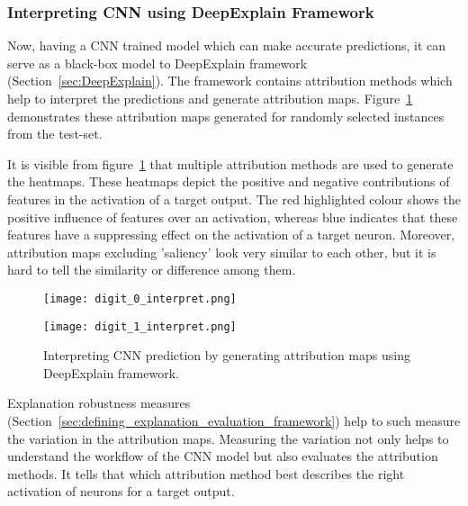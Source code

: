 \documentclass[english]{tktltiki2}
\theoremstyle{definition}
\theoremstyle{remark}
\begin{document}
\subsubsection{Interpreting CNN using DeepExplain Framework}
Now, having a CNN trained model which can make accurate predictions, it can serve as a black-box model to DeepExplain framework (Section~\ref{sec:DeepExplain}). The framework contains attribution methods which help to interpret the predictions and generate attribution maps. Figure~\ref{fig:interpreting_CNN_using_DeepExplain} demonstrates these attribution maps generated for randomly selected instances from the test-set.

It is visible from figure~\ref{fig:interpreting_CNN_using_DeepExplain} that multiple attribution methods are used to generate the heatmaps. These heatmaps depict the positive and negative contributions of features in the activation of a target output. The red highlighted colour shows the positive influence of features over an activation, whereas blue indicates that these features have a suppressing effect on the activation of a target neuron. Moreover, attribution maps excluding 'saliency' look very similar to each other, but it is hard to tell the similarity or difference among them. 

\begin{figure}[H]
	\vspace*{0mm}
	\centering
	\texttt{[image: digit\_0\_interpret.png]}
\end{figure}

\begin{figure}[H]
	\vspace*{-10 mm}
	\centering
	\texttt{[image: digit\_1\_interpret.png]}
	\caption{Interpreting CNN prediction by generating attribution maps using DeepExplain framework.}%
	\label{fig:interpreting_CNN_using_DeepExplain}%
\end{figure}
 
Explanation robustness measures (Section~\ref{sec:defining_explanation_evaluation_framework}) help to such measure the variation in the attribution maps. Measuring the variation not only helps to understand the workflow of the CNN model but also evaluates the attribution methods. It tells that which attribution method best describes the right activation of neurons for a target output.
\end{document}
